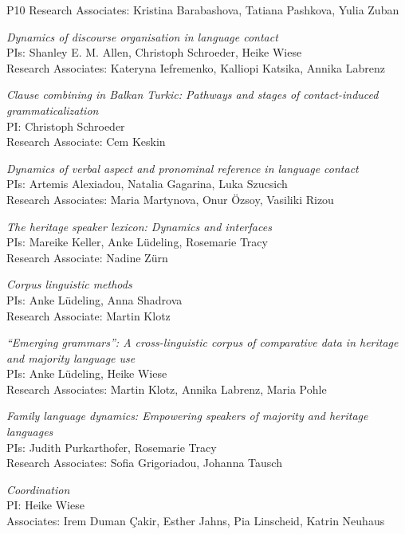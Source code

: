 \documentclass[output=paper,colorlinks,citecolor=brown]{langscibook}
\begin{document}
\begin{labeling}{P10}
    Research Associates: Kristina Barabashova, Tatiana Pashkova, Yulia Zuban
\item[P9] \textit{Dynamics of discourse organisation in language contact} \\
    PIs: Shanley E. M. Allen, Christoph Schroeder, Heike Wiese \\
    Research Associates: Kateryna Iefremenko, Kalliopi Katsika, Annika Labrenz
\item[P9a] \textit{Clause combining in Balkan Turkic: Pathways and stages of contact-induced grammaticalization} \\
    PI: Christoph Schroeder \\
    Research Associate: Cem Keskin
\item[P10] \textit{Dynamics of verbal aspect and pronominal reference in language contact} \\
    PIs: Artemis Alexiadou, Natalia Gagarina, Luka Szucsich \\
    Research Associates: Maria Martynova, Onur Özsoy, Vasiliki Rizou
\item[P11] \textit{The heritage speaker lexicon: Dynamics and interfaces} \\
    PIs: Mareike Keller, Anke Lüdeling, Rosemarie Tracy \\
    Research Associate: Nadine Zürn
\item[Pc] \textit{Corpus linguistic methods} \\
    PIs: Anke Lüdeling, Anna Shadrova \\
    Research Associate: Martin Klotz
\item[Pd] \textit{``Emerging grammars'': A cross-linguistic corpus of comparative data in heritage and majority language use} \\
    PIs: Anke Lüdeling, Heike Wiese \\
    Research Associates: Martin Klotz, Annika Labrenz, Maria Pohle
\item[Pt] \textit{Family language dynamics: Empowering speakers of majority and heritage languages} \\
    PIs: Judith Purkarthofer, Rosemarie Tracy \\
    Research Associates: Sofia Grigoriadou, Johanna Tausch
\item[Pz] \textit{Coordination} \\
    PI: Heike Wiese \\
    Associates: Irem Duman Çakir, Esther Jahns, Pia Linscheid, Katrin Neuhaus
\end{labeling}
\end{document}
